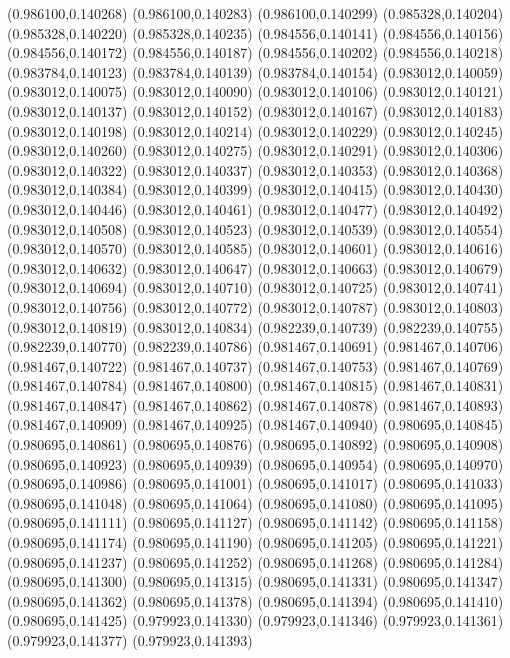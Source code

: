 (0.986100,0.140268)
(0.986100,0.140283)
(0.986100,0.140299)
(0.985328,0.140204)
(0.985328,0.140220)
(0.985328,0.140235)
(0.984556,0.140141)
(0.984556,0.140156)
(0.984556,0.140172)
(0.984556,0.140187)
(0.984556,0.140202)
(0.984556,0.140218)
(0.983784,0.140123)
(0.983784,0.140139)
(0.983784,0.140154)
(0.983012,0.140059)
(0.983012,0.140075)
(0.983012,0.140090)
(0.983012,0.140106)
(0.983012,0.140121)
(0.983012,0.140137)
(0.983012,0.140152)
(0.983012,0.140167)
(0.983012,0.140183)
(0.983012,0.140198)
(0.983012,0.140214)
(0.983012,0.140229)
(0.983012,0.140245)
(0.983012,0.140260)
(0.983012,0.140275)
(0.983012,0.140291)
(0.983012,0.140306)
(0.983012,0.140322)
(0.983012,0.140337)
(0.983012,0.140353)
(0.983012,0.140368)
(0.983012,0.140384)
(0.983012,0.140399)
(0.983012,0.140415)
(0.983012,0.140430)
(0.983012,0.140446)
(0.983012,0.140461)
(0.983012,0.140477)
(0.983012,0.140492)
(0.983012,0.140508)
(0.983012,0.140523)
(0.983012,0.140539)
(0.983012,0.140554)
(0.983012,0.140570)
(0.983012,0.140585)
(0.983012,0.140601)
(0.983012,0.140616)
(0.983012,0.140632)
(0.983012,0.140647)
(0.983012,0.140663)
(0.983012,0.140679)
(0.983012,0.140694)
(0.983012,0.140710)
(0.983012,0.140725)
(0.983012,0.140741)
(0.983012,0.140756)
(0.983012,0.140772)
(0.983012,0.140787)
(0.983012,0.140803)
(0.983012,0.140819)
(0.983012,0.140834)
(0.982239,0.140739)
(0.982239,0.140755)
(0.982239,0.140770)
(0.982239,0.140786)
(0.981467,0.140691)
(0.981467,0.140706)
(0.981467,0.140722)
(0.981467,0.140737)
(0.981467,0.140753)
(0.981467,0.140769)
(0.981467,0.140784)
(0.981467,0.140800)
(0.981467,0.140815)
(0.981467,0.140831)
(0.981467,0.140847)
(0.981467,0.140862)
(0.981467,0.140878)
(0.981467,0.140893)
(0.981467,0.140909)
(0.981467,0.140925)
(0.981467,0.140940)
(0.980695,0.140845)
(0.980695,0.140861)
(0.980695,0.140876)
(0.980695,0.140892)
(0.980695,0.140908)
(0.980695,0.140923)
(0.980695,0.140939)
(0.980695,0.140954)
(0.980695,0.140970)
(0.980695,0.140986)
(0.980695,0.141001)
(0.980695,0.141017)
(0.980695,0.141033)
(0.980695,0.141048)
(0.980695,0.141064)
(0.980695,0.141080)
(0.980695,0.141095)
(0.980695,0.141111)
(0.980695,0.141127)
(0.980695,0.141142)
(0.980695,0.141158)
(0.980695,0.141174)
(0.980695,0.141190)
(0.980695,0.141205)
(0.980695,0.141221)
(0.980695,0.141237)
(0.980695,0.141252)
(0.980695,0.141268)
(0.980695,0.141284)
(0.980695,0.141300)
(0.980695,0.141315)
(0.980695,0.141331)
(0.980695,0.141347)
(0.980695,0.141362)
(0.980695,0.141378)
(0.980695,0.141394)
(0.980695,0.141410)
(0.980695,0.141425)
(0.979923,0.141330)
(0.979923,0.141346)
(0.979923,0.141361)
(0.979923,0.141377)
(0.979923,0.141393)
